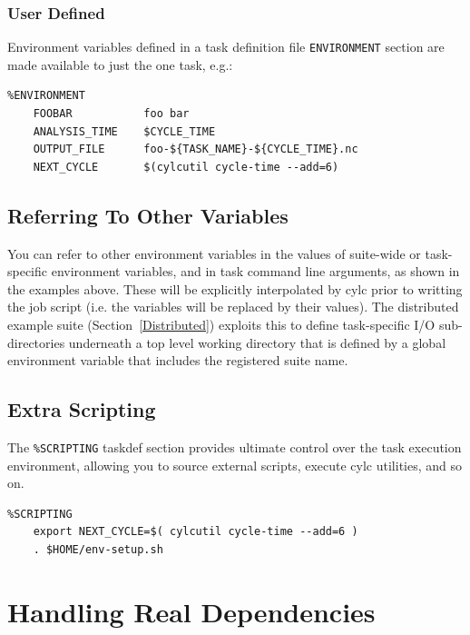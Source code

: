 \documentclass[11pt,a4paper]{article}
\begin{document}
\subsubsection{User Defined}
\lstset{language=cylctaskdef}

Environment variables defined in a task definition file
\lstinline=ENVIRONMENT= section are made available
to just the one task, e.g.:

\begin{lstlisting}
%ENVIRONMENT
    FOOBAR           foo bar
    ANALYSIS_TIME    $CYCLE_TIME
    OUTPUT_FILE      foo-${TASK_NAME}-${CYCLE_TIME}.nc
    NEXT_CYCLE       $(cylcutil cycle-time --add=6)
\end{lstlisting}

\lstset{language=bash}

\subsection{Referring To Other Variables}
\label{ReferringToOtherVariables}

\lstset{language=bash}

You can refer to other environment variables in the values of
suite-wide or task-specific environment variables, and in task command
line arguments, as shown in the examples above. These will be explicitly
interpolated by cylc prior to writting the job script (i.e.
the variables will be replaced by their values).  The distributed example
suite (Section~\ref{Distributed}) exploits this to define task-specific
I/O sub-directories underneath a top level working directory that is
defined by a global environment variable that includes the registered
suite name.

\subsection{Extra Scripting}

The \lstinline=%SCRIPTING= taskdef section provides ultimate
control over the task execution environment, allowing you to source
external scripts, execute cylc utilities, and so on.

\begin{lstlisting}
%SCRIPTING
    export NEXT_CYCLE=$( cylcutil cycle-time --add=6 )
    . $HOME/env-setup.sh
\end{lstlisting}

\pagebreak
\section{Handling Real Dependencies}
\label{HandlingRealDependencies}
\end{document}
